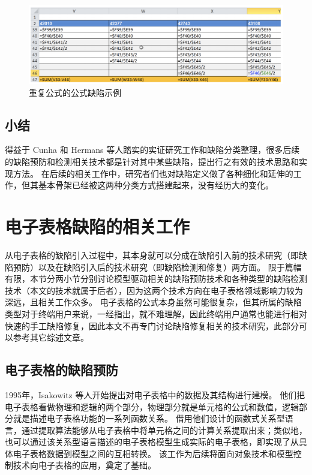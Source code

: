 \begin{figure}[tbp]    
    \centering
    \includegraphics[width=\textwidth]{figure/relatedwork/DuplicatedFormula.png}
    \caption{重复公式的公式缺陷示例}
    \label{figure-DuplicatedFormula}
\end{figure}

\subsection{小结}
得益于 Cunha 和 Hermans 等人踏实的实证研究工作和缺陷分类整理\cite{cunha2012towards,hermans2012detecting2,jansen2015code}，很多后续的缺陷预防和检测相关技术都是针对其中某些缺陷，提出行之有效的技术思路和实现方法。
在后续的相关工作中，研究者们也对缺陷定义做了各种细化和延伸的工作，但其基本骨架已经被这两种分类方式搭建起来，没有经历大的变化。


\section{电子表格缺陷的相关工作}
从电子表格的缺陷引入过程中，其本身就可以分成在缺陷引入前的技术研究（即缺陷预防）以及在缺陷引入后的技术研究（即缺陷检测和修复）两方面。
限于篇幅有限，本节分两小节分别讨论模型驱动相关的缺陷预防技术和各种类型的缺陷检测技术（本文的技术就属于后者），因为这两个技术方向在电子表格领域影响力较为深远，且相关工作众多。
电子表格的公式本身虽然可能很复杂，但其所属的缺陷类型对于终端用户来说，一经指出，就不难理解，因此终端用户通常也能进行相对快速的手工缺陷修复，因此本文不再专门讨论缺陷修复相关的技术研究，此部分可以参考其它综述文章\cite{jannach2014avoiding}。

\subsection{电子表格的缺陷预防}
1995年，Isakowitz 等人\cite{isakowitz1995toward}开始提出对电子表格中的数据及其结构进行建模。
他们把电子表格看做物理和逻辑的两个部分，物理部分就是单元格的公式和数值，逻辑部分就是描述电子表格功能的一系列函数关系。
借用他们设计的函数式关系型语言，通过提取算法能够从电子表格中将单元格之间的计算关系提取出来；类似地，也可以通过该关系型语言描述的电子表格模型生成实际的电子表格，即实现了从具体电子表格数据到模型之间的互相转换。
该工作为后续将面向对象技术和模型控制技术向电子表格的应用，奠定了基础。

